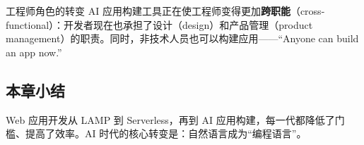 \begin{knowledgebox}{工程师角色的转变}
AI 应用构建工具正在使工程师变得更加\textbf{跨职能}（cross-functional）：开发者现在也承担了设计（design）和产品管理（product management）的职责。同时，非技术人员也可以构建应用——``Anyone can build an app now.''
\end{knowledgebox}

\subsection{本章小结}

Web 应用开发从 LAMP 到 Serverless，再到 AI 应用构建，每一代都降低了门槛、提高了效率。AI 时代的核心转变是：自然语言成为``编程语言''。

